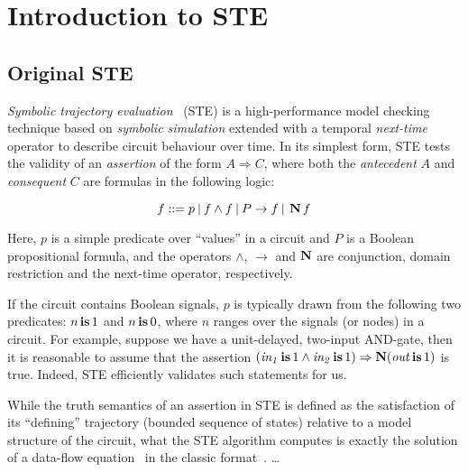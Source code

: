 \section{Introduction to STE}

\subsection{Original STE}

\textit{Symbolic trajectory evaluation}~\cite{seger1995} (STE) is a high-performance model checking technique based on \textit{symbolic simulation} extended with a temporal \textit{next-time} operator to describe circuit behaviour over time. In its simplest form, STE tests the validity of an \textit{assertion} of the form $A \Rightarrow C$, where both the \textit{antecedent} $A$ and \textit{consequent} $C$ are formulas in the following logic:

\begin{equation*}
f ::= p \: | \: f \wedge f \: | \: P \rightarrow f \: | \: \operatorname{\textbf{N}} f
\end{equation*}

\noindent Here, $p$ is a simple predicate over ``values'' in a circuit and $P$ is a Boolean propositional formula, and the operators $\wedge$, $\rightarrow$ and $\operatorname{\textbf{N}}$ are conjunction, domain restriction and the next-time operator, respectively.

If the circuit contains Boolean signals, $p$ is typically drawn from the following two predicates: $n \operatorname{\mathbin{\textbf{is}}} 1$ and $n \operatorname{\mathbin{\textbf{is}}} 0$, where $n$ ranges over the signals (or nodes) in a circuit. For example, suppose we have a unit-delayed, two-input AND-gate, then it is reasonable to assume that the assertion $(\mathit{in_{1}} \operatorname{\mathbin{\textbf{is}}} 1 \wedge \mathit{in_{2}} \operatorname{\mathbin{\textbf{is}}} 1) \Rightarrow \operatorname{\textbf{N}} (\mathit{out} \operatorname{\mathbin{\textbf{is}}} 1)$ is true. Indeed, STE efficiently validates such statements for us.

While the truth semantics of an assertion in STE is defined as the satisfaction of its ``defining'' trajectory (bounded sequence of states) relative to a model structure of the circuit, what the STE algorithm computes is exactly the solution of a data-flow equation~\cite{chou1999} in the classic format~\cite{muchnick1997}. \dots



